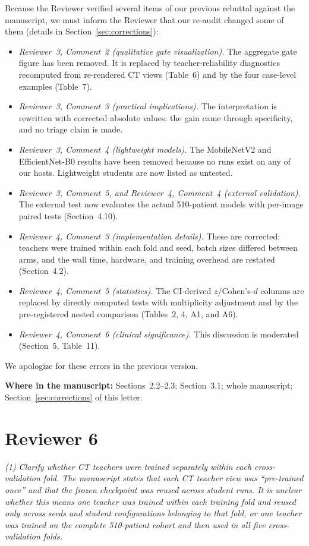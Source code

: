 \documentclass[11pt]{article}
\newenvironment{rcomment}{\par\noindent\begin{minipage}{\linewidth}\itshape\color{black!75}}{\end{minipage}\par}
\newcommand{\where}[1]{\par\noindent\textbf{Where in the manuscript:} #1\par}
\begin{document}
Because the Reviewer verified several items of our previous rebuttal against
the manuscript, we must inform the Reviewer that our re-audit changed some of
them (details in Section~\ref{sec:corrections}):
\begin{itemize}[leftmargin=1.4em]
  \item \emph{Reviewer~3, Comment~2 (qualitative gate visualization).} The aggregate gate figure has been removed. It is replaced by teacher-reliability diagnostics recomputed from re-rendered CT views (Table~6) and by the four case-level examples (Table~7).
  \item \emph{Reviewer~3, Comment~3 (practical implications).} The interpretation is rewritten with corrected absolute values: the gain came through specificity, and no triage claim is made.
  \item \emph{Reviewer~3, Comment~4 (lightweight models).} The MobileNetV2 and EfficientNet-B0 results have been removed because no runs exist on any of our hosts. Lightweight students are now listed as untested.
  \item \emph{Reviewer~3, Comment~5, and Reviewer~4, Comment~4 (external validation).} The external test now evaluates the actual 510-patient models with per-image paired tests (Section~4.10).
  \item \emph{Reviewer~4, Comment~3 (implementation details).} These are corrected: teachers were trained within each fold and seed, batch sizes differed between arms, and the wall time, hardware, and training overhead are restated (Section~4.2).
  \item \emph{Reviewer~4, Comment~5 (statistics).} The CI-derived $z$/Cohen's-$d$ columns are replaced by directly computed tests with multiplicity adjustment and by the pre-registered nested comparison (Tables~2, 4, A1, and A6).
  \item \emph{Reviewer~4, Comment~6 (clinical significance).} This discussion is moderated (Section~5, Table~11).
\end{itemize}
We apologize for these errors in the previous version.
\where{Sections~2.2--2.3; Section~3.1; whole manuscript; Section~\ref{sec:corrections} of this letter.}

\hrulefill

\section*{Reviewer 6}

\begin{rcomment}
(1) Clarify whether CT teachers were trained separately within each cross-validation fold. The manuscript states that each CT teacher view was ``pre-trained once'' and that the frozen checkpoint was reused across student runs. It is unclear whether this means one teacher was trained within each training fold and reused only across seeds and student configurations belonging to that fold, or one teacher was trained on the complete 510-patient cohort and then used in all five cross-validation folds.
\end{rcomment}
\end{document}
